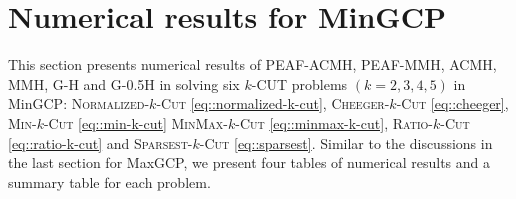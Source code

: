 \documentclass[12pt, a4paper]{article}%
\numberwithin{equation}{section}
\theoremstyle{plain}
\newcommand{\blue}{\textcolor{blue}}
\begin{document}
				
				\section{Numerical results for MinGCP}
				\label{sec::minGCP}
				
				This section presents numerical results of PEAF-ACMH, PEAF-MMH, ACMH, MMH, G-H and G-0.5H in solving six $k$-CUT problems $(k=2,3,4,5)$ in MinGCP: \textsc{Normalized}-$k$-\textsc{Cut} \eqref{eq::normalized-k-cut},  \textsc{Cheeger}-$k$-\textsc{Cut} \eqref{eq::cheeger}, \textsc{Min}-$k$-\textsc{Cut} \eqref{eq::min-k-cut} \textsc{MinMax}-$k$-\textsc{Cut} \eqref{eq::minmax-k-cut}, \textsc{Ratio}-$k$-\textsc{Cut} \eqref{eq::ratio-k-cut} and \textsc{Sparsest}-$k$-\textsc{Cut} \eqref{eq::sparsest}. Similar to the discussions in the last section for MaxGCP, we present four tables of numerical results and a summary table for each problem. %
				
			
			
			
			
\end{document}
